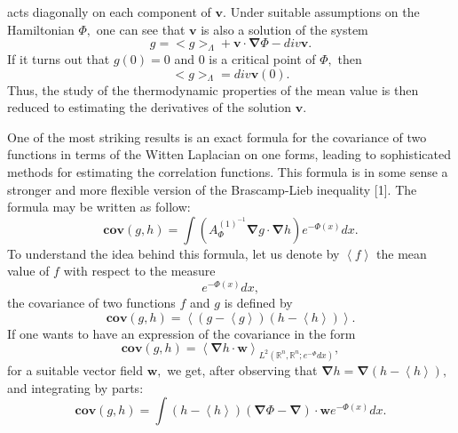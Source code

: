\documentclass{article}
\begin{document}
acts diagonally on each component of $\mathbf{v.}$ Under suitable
assumptions on the Hamiltonian $\Phi ,$ one can see that $\mathbf{v}$ is
also a solution of the system%
\begin{equation*}
g=<g>_{\Lambda }+\mathbf{v}\cdot \mathbf{\nabla }\Phi -div\mathbf{v.}
\end{equation*}%
If it turns out that $g(0)=0$ and $0$ is a critical point of $\Phi ,$ then 
\begin{equation*}
<g>_{\Lambda }=div\mathbf{v}(0).
\end{equation*}%
Thus, the study of the thermodynamic properties of the mean value is then
reduced to estimating the derivatives of the solution $\mathbf{v.}$

One of the most striking results is an exact formula for the covariance of
two functions in terms of the Witten Laplacian on one forms, leading to
sophisticated methods for estimating the correlation functions. This formula
is in some sense a stronger and more flexible version of the Brascamp-Lieb
inequality [1]. The formula may be written as follow:%
\begin{equation}
\mathbf{cov}(g,h)=\int \left( A_{\Phi }^{(1)^{-1}}\mathbf{\nabla }g\cdot 
\mathbf{\nabla }h\right) e^{-\Phi (x)}dx.
\end{equation}%
To understand the idea behind this formula, let us denote by $\left\langle
f\right\rangle $ the mean value of $f$ with respect to the measure 
\begin{equation*}
e^{-\Phi (x)}dx,
\end{equation*}%
the covariance of two functions $f$ and $g$ is defined by 
\begin{equation}
\mathbf{cov}(g,h)=\left\langle (g-\left\langle g\right\rangle
)(h-\left\langle h\right\rangle )\right\rangle .
\end{equation}%
If one wants to have an expression of the covariance in the form 
\begin{equation}
\mathbf{cov}(g,h)=\left\langle \mathbf{\nabla }h\cdot \mathbf{w}%
\right\rangle _{L^{2}(\mathbb{R}^{n},\mathbb{R}^{n};e^{-\Phi }dx)},
\end{equation}%
for a suitable vector field $\mathbf{w,}$ we get, after observing that $%
\mathbf{\nabla }h=\mathbf{\nabla }(h-\left\langle h\right\rangle ),$ and
integrating by parts:%
\begin{equation}
\mathbf{cov}(g,h)=\int (h-\left\langle h\right\rangle )(\mathbf{\nabla }\Phi
-\mathbf{\nabla })\cdot \mathbf{w}e^{-\Phi (x)}dx.
\end{equation}%
\end{document}
